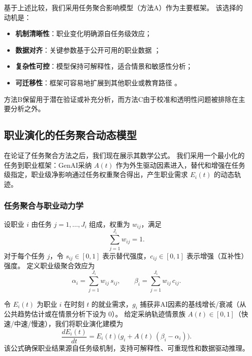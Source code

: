 基于上述比较，我们采用任务聚合影响模型（方法A）作为主要框架。
该选择的动机是：
\begin{itemize}
    \item \textbf{机制清晰性}：职业变化明确源自任务级效应；
    \item \textbf{数据对齐}：关键参数基于公开可用的职业数据 \cite{onet2025database,censuspseo2025}；
    \item \textbf{复杂性可控}：模型保持可解释性，适合情景和敏感性分析；
    \item \textbf{可迁移性}：框架可容易地扩展到其他职业或教育路径 \cite{ncescip2020soc2018}。
\end{itemize}

方法B保留用于潜在验证或补充分析，而方法C由于校准和透明性问题被排除在主要分析之外。

\subsection{职业演化的任务聚合动态模型}

在论证了任务聚合方法之后，我们现在展示其数学公式。
我们采用一个最小化的任务到职业框架：GenAI采纳 $A(t)$ 作为外生驱动因素进入，替代和增强在任务级指定，职业级净影响通过任务权重聚合得出，产生职业需求 $E_i(t)$ 的动态轨迹。

\subsubsection{任务聚合与职业动力学}

设职业 $i$ 由任务 $j=1,\dots,J_i$ 组成，权重为 $w_{ij}$，满足
\begin{equation}
    \sum_{j=1}^{J_i} w_{ij} = 1.
\end{equation}
对于每个任务 $j$，令 $s_{ij}\in[0,1]$ 表示替代强度，$c_{ij}\in[0,1]$ 表示增强（互补性）强度。
定义职业级聚合效应为
\begin{equation}
    \alpha_i=\sum_{j=1}^{J_i} w_{ij}\,s_{ij},\qquad
    \beta_i=\sum_{j=1}^{J_i} w_{ij}\,c_{ij}.
\end{equation}

令 $E_i(t)$ 为职业 $i$ 在时刻 $t$ 的就业需求，$g_i$ 捕获非AI因素的基线增长/衰减（从公共趋势估计或在情景分析下设为 $0$）。
给定采纳轨迹情景族 $A(t)\in[0,1]$（快速/中速/慢速），我们将职业演化建模为
\begin{equation}
    \frac{dE_i(t)}{dt}=E_i(t)\Big(g_i + A(t)\,(\beta_i-\alpha_i)\Big).
\end{equation}
该公式确保职业结果源自任务级机制，支持可解释性、可重现性和数据驱动推理。

